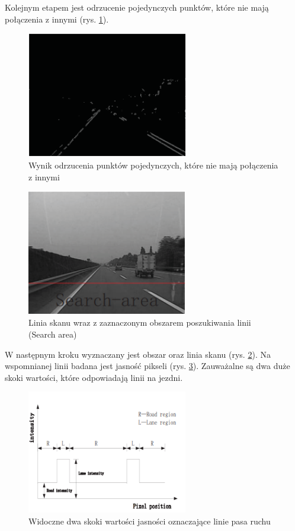 Kolejnym etapem jest odrzucenie pojedynczych punktów, które nie mają połączenia z innymi (rys. \ref{fig:lane_detection2_noise2}).
\begin{figure}
  \centering
  \includegraphics[width=7cm]{img/lane_detection2_noise2.png}
  \caption{Wynik odrzucenia punktów pojedynczych, które nie mają połączenia z innymi\cite{T6}}
  \label{fig:lane_detection2_noise2}
\end{figure}

\begin{figure}
  \centering
  \includegraphics[width=7cm]{img/lane_detection2_search_line.png}
  \caption{Linia skanu wraz z zaznaczonym obszarem poszukiwania linii (Search area)\cite{T6}}
  \label{fig:lane_detection2_search_area}
\end{figure}

W następnym kroku wyznaczany jest obszar oraz linia skanu (rys. \ref{fig:lane_detection2_search_area}). 
Na wspomnianej linii badana jest jasność pikseli (rys. \ref{fig:lane_detection2_intensity}). Zauważalne są dwa duże skoki wartości, które odpowiadają linii na jezdni.

\begin{figure}
  \centering
  \includegraphics[width=7cm]{img/lane_detection2_intensity.png}
  \caption{Widoczne dwa skoki wartości jasności oznaczające linie pasa ruchu\cite{T6}}
  \label{fig:lane_detection2_intensity}
\end{figure}

